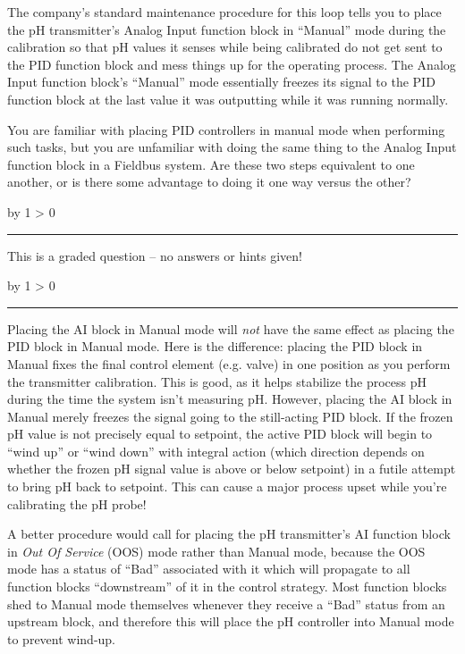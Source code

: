\documentclass[12pt,a4paper]{article}
\def\svar{
           \advance\answnum by 1
           \ifnum \answnum > 0
                \hrule
                \vskip 3pt
                \leftline{Svar \the\answnum}
                \vskip 3pt \fi}
\def\notes{
           \advance\explnum by 1
           \ifnum \explnum > 0
                \hrule
                \vskip 3pt
                \leftline{Notes \the\explnum}
                \vskip 3pt \fi}
\begin{document}
The company's standard maintenance procedure for this loop tells you to place the pH transmitter's Analog Input function block in ``Manual'' mode during the calibration so that pH values it senses while being calibrated do not get sent to the PID function block and mess things up for the operating process.  The Analog Input function block's ``Manual'' mode essentially freezes its signal to the PID function block at the last value it was outputting while it was running normally.

\vskip 10pt

You are familiar with placing PID controllers in manual mode when performing such tasks, but you are unfamiliar with doing the same thing to the Analog Input function block in a Fieldbus system.  Are these two steps equivalent to one another, or is there some advantage to doing it one way versus the other?

\vfil

\eject
\vskip 10pt \filbreak 





\svar{} 

This is a graded question -- no answers or hints given!

\vskip 10pt \filbreak 





\notes{} 

Placing the AI block in Manual mode will {\it not} have the same effect as placing the PID block in Manual mode.  Here is the difference: placing the PID block in Manual fixes the final control element (e.g. valve) in one position as you perform the transmitter calibration.  This is good, as it helps stabilize the process pH during the time the system isn't measuring pH.  However, placing the AI block in Manual merely freezes the signal going to the still-acting PID block.  If the frozen pH value is not precisely equal to setpoint, the active PID block will begin to ``wind up'' or ``wind down'' with integral action (which direction depends on whether the frozen pH signal value is above or below setpoint) in a futile attempt to bring pH back to setpoint.  This can cause a major process upset while you're calibrating the pH probe!

A better procedure would call for placing the pH transmitter's AI function block in {\it Out Of Service} (OOS) mode rather than Manual mode, because the OOS mode has a status of ``Bad'' associated with it which will propagate to all function blocks ``downstream'' of it in the control strategy.  Most function blocks shed to Manual mode themselves whenever they receive a ``Bad'' status from an upstream block, and therefore this will place the pH controller into Manual mode to prevent wind-up.
\end{document}
